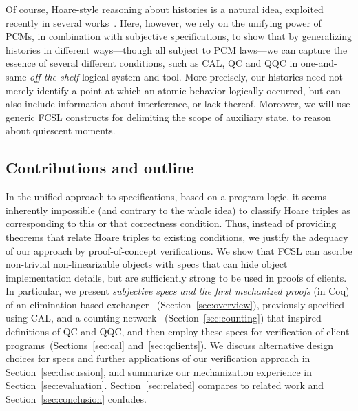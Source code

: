 Of course, Hoare-style reasoning about histories is a natural idea,
exploited recently in several
works~\cite{Fu-al:CONCUR10,Gotsman-al:ESOP13,Bell-al:SAS10,Hemed-al:DISC15}. Here,
however, we rely on the unifying power of PCMs, in combination with
subjective specifications, to show that by generalizing histories in
different ways---though all subject to PCM laws---we can capture the
essence of several different conditions, such as CAL, QC and QQC in
one-and-same \emph{off-the-shelf} logical system and tool.
%
More precisely, our histories need not merely identify a point at
which an atomic behavior logically occurred, but can also include
information about interference, or lack thereof. Moreover, we will use
generic FCSL constructs for delimiting the scope of auxiliary state,
to reason about quiescent moments.
%
%

\subsection{Contributions and outline}
\label{sec:chall-contr}

In the unified approach to specifications, based on a program logic,
it seems inherently impossible (and contrary to the whole idea) to
classify Hoare triples as corresponding to this or that correctness
condition. Thus, instead of providing theorems that relate Hoare
triples to existing conditions, we justify the adequacy of our
approach by proof-of-concept verifications. We show that FCSL can
ascribe non-trivial non-linearizable objects with specs that can hide
object implementation details, but are sufficiently strong to be used
in proofs of clients.
%
In particular, we present \emph{subjective specs and the first
  mechanized proofs} (in Coq) of an elimination-based
exchanger~\cite{Scherer-al:SCOOL05} (Section~\ref{sec:overview}),
previously specified using CAL, and a counting
network~\cite{Aspnes-al:JACM94} (Section~\ref{sec:counting}) that
inspired definitions of QC and QQC, and then employ these specs for
verification of client programs~(Sections~\ref{sec:cal}
and~\ref{sec:qclients}).
%
%
We discuss alternative design choices for specs and further
applications of our verification approach in
Section~\ref{sec:discussion}, and summarize our mechanization
experience in Section~\ref{sec:evaluation}. Section~\ref{sec:related}
compares to related work and Section~\ref{sec:conclusion} conludes.

